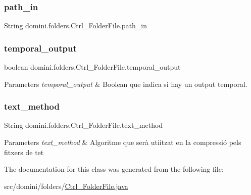 \subsubsection{\texorpdfstring{path\+\_\+in}{path\_in}}
{\footnotesize\ttfamily String domini.\+folders.\+Ctrl\+\_\+\+Folder\+File.\+path\+\_\+in\hspace{0.3cm}{\ttfamily [private]}}

\mbox{\label{classdomini_1_1folders_1_1Ctrl__FolderFile_a0db81590abe27b21a9b8c37633c86fa6}} 
\subsubsection{\texorpdfstring{temporal\+\_\+output}{temporal\_output}}
{\footnotesize\ttfamily boolean domini.\+folders.\+Ctrl\+\_\+\+Folder\+File.\+temporal\+\_\+output\hspace{0.3cm}{\ttfamily [private]}}


\begin{DoxyParams}{Parameters}
{\em temporal\+\_\+output} & Boolean que indica si hay un output temporal. \\
\hline
\end{DoxyParams}
\mbox{\label{classdomini_1_1folders_1_1Ctrl__FolderFile_a75ef571be454360b835f552d2cf20741}} 
\subsubsection{\texorpdfstring{text\+\_\+method}{text\_method}}
{\footnotesize\ttfamily String domini.\+folders.\+Ctrl\+\_\+\+Folder\+File.\+text\+\_\+method\hspace{0.3cm}{\ttfamily [private]}}


\begin{DoxyParams}{Parameters}
{\em text\+\_\+method} & Algoritme que serà utiitzat en la compressió pels fitxers de tet \\
\hline
\end{DoxyParams}


The documentation for this class was generated from the following file\+:\begin{DoxyCompactItemize}
\item 
src/domini/folders/\hyperlink{Ctrl__FolderFile_8java}{Ctrl\+\_\+\+Folder\+File.\+java}\end{DoxyCompactItemize}
